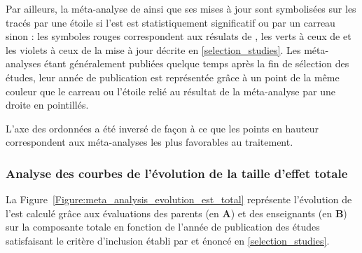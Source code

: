 Par ailleurs, la méta-analyse de \citet{Cortese2016} ainsi que ses mises
à jour sont symbolisées sur les tracés par une étoile si l'\gls{est} est statistiquement significatif ou par un carreau sinon : les symboles
rouges correspondent aux résulats de \citet{Cortese2016}, les verts à ceux de \citet{Bussalb2019clinical} et les violets à ceux de la mise à jour décrite en \ref{selection_studies}. Les méta-analyses
étant généralement publiées quelque temps après la fin de sélection des études, leur année de publication est représentée grâce à un point de la même couleur que le carreau ou
l'étoile relié au résultat de la méta-analyse par une droite en pointillés. 

L'axe des ordonnées a été inversé de façon à ce que les points en hauteur correspondent aux méta-analyses les plus favorables au traitement.


\subsubsection{Analyse des courbes de l'évolution de la taille d'effet totale}

La Figure~\ref{Figure:meta_analysis_evolution_est_total} représente l'évolution de l'\gls{est} calculé grâce aux évaluations des parents (en \textbf{A}) et des 
enseignants (en \textbf{B}) sur la composante totale en fonction de l'année de publication des études satisfaisant le critère d'inclusion établi par \citep{Cortese2016} et énoncé en 
\ref{selection_studies}.

